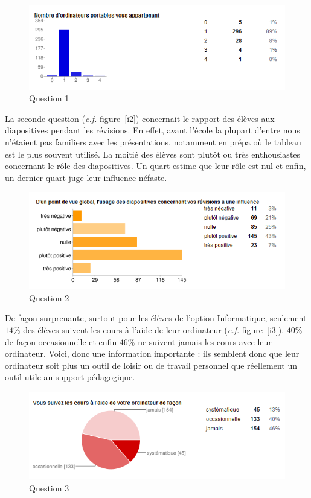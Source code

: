 \documentclass[a4paper,11pt,french]{article}
\begin{document}
\begin{figure}[h!]
\includegraphics[width=\textwidth]{i1.PNG}
\caption{Question 1}
\label{i1}
\end{figure}

La seconde question (\textit{c.f.} figure~\vref{i2}) concernait le rapport des élèves aux diapositives pendant les révisions. En effet, avant l’école la plupart d’entre nous n'étaient pas familiers avec les présentations, notamment en prépa où le tableau est le plus souvent utilisé. La moitié des élèves sont plutôt ou très enthousiastes concernant le rôle des diapositives. Un quart estime que leur rôle est nul et enfin, un dernier quart juge leur influence néfaste.\\

\begin{figure}[h!]
\includegraphics[width=\textwidth]{i2.PNG}
\caption{Question 2}
\label{i2}
\end{figure}


De façon surprenante, surtout pour les élèves de l’option Informatique, seulement $14\%$ des élèves suivent les cours à l’aide de leur ordinateur (\textit{c.f.} figure~\vref{i3}). $40\%$ de façon occasionnelle et enfin $46\%$ ne suivent jamais les cours avec leur ordinateur. Voici, donc une information importante : ils semblent donc que leur ordinateur soit plus un outil de loisir ou de travail personnel que réellement un outil utile au support pédagogique.

\begin{figure}[h!]
\includegraphics[width=\textwidth]{i3.PNG}
\caption{Question 3}
\label{i3}
\end{figure}
\end{document}
